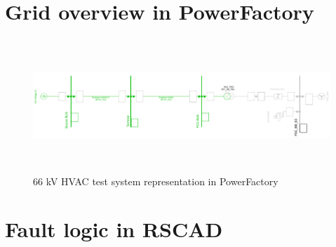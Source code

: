 \section{Grid overview in PowerFactory}
\begin{figure}[H]
\centering
    \includegraphics[height = 5cm,width = 17.5cm]{Diagrams/Appendix_B/WT1_AC_PFD_network_view.pdf}
    \caption{66 kV HVAC test system representation in PowerFactory}
    \label{fig:WT1_AC_PFD_network_view}
\end{figure}


\section{Fault logic in RSCAD}
